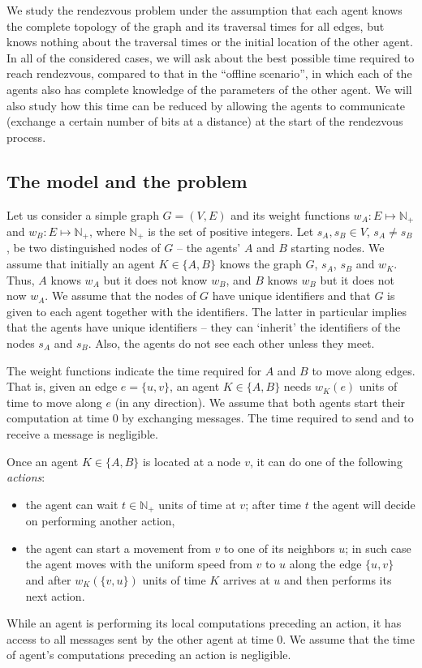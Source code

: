 \documentclass{llncs}
\newcommand{\startpos}[1]{s_{#1}}
\newcommand{\starta}{\startpos{A}}
\newcommand{\startb}{\startpos{B}}
\newcommand{\nat}{\mathbb{N}_{+}}
\newcommand{\agentVariable}{K}
\begin{document}
We study the rendezvous problem under the assumption that each agent knows the complete topology of the graph and its traversal times for all edges, but knows nothing about the traversal times or the initial location of the other agent. In all of the considered cases, 
we will ask about the best possible time required to reach rendezvous, 
compared to that in the ``offline scenario'', in which each of the agents also has complete knowledge of the parameters of the other agent. 
We will also study how this time can be reduced by allowing the agents to communicate (exchange a certain number of bits at a distance) 
at the start of the rendezvous process.
 
\subsection{The model and the problem}

Let us consider a simple graph $G = (V,E)$ and its weight functions $w_A : E \mapsto \nat$ and $w_B : E \mapsto \nat$, where $\nat$ is the set of positive integers.
Let $\starta, \startb \in V$, $\starta \neq \startb$, be two distinguished nodes of $G$ -- the agents' $A$ and $B$ starting nodes.
We assume that initially an agent $\agentVariable\in\{A,B\}$ knows the graph $G$, $\starta$, $\startb$ and $w_{\agentVariable}$.
Thus, $A$ knows $w_A$ but it does not know $w_B$, and $B$ knows $w_B$ but it does not now $w_A$.
We assume that the nodes of $G$ have unique identifiers and that $G$ is given to each agent together with the identifiers.
The latter in particular implies that the agents have unique identifiers -- they can `inherit' the identifiers of the nodes $\starta$ and $\startb$.
Also, the agents do not see each other unless they meet.

The weight functions indicate the time required for $A$ and $B$ to move along edges.
That is, given an edge $ e = \{u, v\}$, an agent ${\agentVariable}\in\{A,B\}$ needs $w_{\agentVariable}(e)$ units of time to move along $e$ (in any direction).
We assume that both agents start their computation at time $0$ by exchanging messages. The time required to send and to receive a message is negligible.

Once an agent ${\agentVariable}\in\{A,B\}$ is located at a node $v$, it can do one of the following \emph{actions}:
\begin{itemize}
 \item the agent can wait $t\in \nat$ units of time at $v$; after time $t$ the agent will decide on performing another action,
 \item the agent can start a movement from $v$ to one of its neighbors $u$; in such case the agent moves with the uniform speed from $v$ to $u$ along the edge $\{u,v\}$ and after $w_{\agentVariable}(\{v,u\})$ units of time ${\agentVariable}$ arrives at $u$ and then performs its next action.
\end{itemize}
While an agent is performing its local computations preceding an action, it has access to all messages sent by the other agent at time $0$.
We assume that the time of agent's computations preceding an action is negligible.
\end{document}
